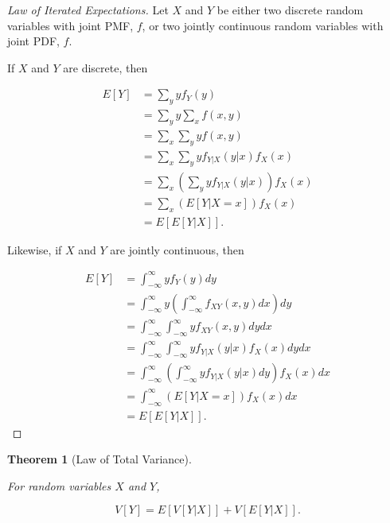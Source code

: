 \documentclass[
]{article}
\newtheorem{theorem}{Theorem}[section]
\theoremstyle{definition}
\theoremstyle{definition}
\theoremstyle{definition}
\theoremstyle{remark}
\begin{document}
\begin{proof}[Law of Iterated Expectations]

Let \(X\) and \(Y\) be either two discrete random variables with joint PMF, \(f\), or two jointly continuous random variables with joint PDF, \(f\).

If \(X\) and \(Y\) are discrete, then

\begin{align}
E[Y] &= \sum_y yf_Y(y) \\
     &= \sum_y y \sum_x f(x,y) \\
     &= \sum_x \sum_y yf(x,y) \\
     &= \sum_x \sum_y yf_{Y|X}(y|x)f_X(x) \\
     &= \sum_x (\sum_y yf_{Y|X}(y|x))f_X(x) \\
     &= \sum_x (E[Y | X=x])f_X(x) \\
     &= E[E[Y | X]].
\end{align}

Likewise, if \(X\) and \(Y\) are jointly continuous, then

\begin{align}
E[Y] &= \int_{-\infty}^{\infty} yf_Y(y)dy \\
     &= \int_{-\infty}^{\infty} y (\int_{-\infty}^{\infty} f_{XY}(x,y)dx) dy \\
     &= \int_{-\infty}^{\infty} \int_{-\infty}^{\infty} yf_{XY}(x,y)dydx \\
     &= \int_{-\infty}^{\infty} \int_{-\infty}^{\infty} yf_{Y|X}(y|x) f_X(x)dydx \\
     &= \int_{-\infty}^{\infty} (\int_{-\infty}^{\infty} yf_{Y|X}(y|x)dy) f_X(x)dx \\
     &= \int_{-\infty}^{\infty} (E[Y | X=x]) f_X(x)dx \\
     &= E[E[Y | X]].
\end{align}

\end{proof}

\begin{theorem}[Law of Total Variance]
\protect\hypertarget{thm:unlabeled-div-99}{}\label{thm:unlabeled-div-99}

For random variables \(X\) and \(Y\),

\[V[Y] = E[V[Y | X]] + V[E[Y | X]].\]

\end{theorem}
\end{document}

